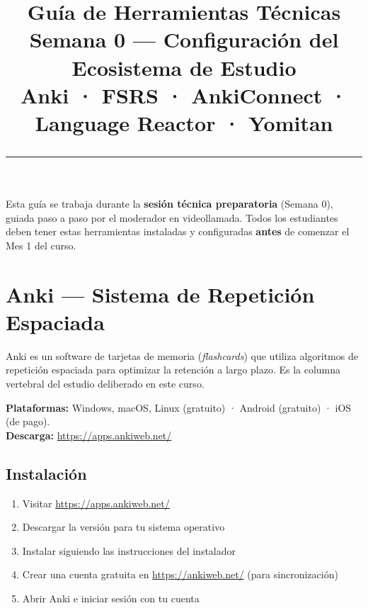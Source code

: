 \documentclass[12pt,a4paper]{article}
\title{%
  \vspace{-1cm}
  {\Huge\bfseries Guía de Herramientas Técnicas}\\[0.3cm]
  {\Large Semana 0 — Configuración del Ecosistema de Estudio}\\[0.2cm]
  {\large\color{grissuave} Anki · FSRS · AnkiConnect · Language Reactor · Yomitan}\\[0.5cm]
  \rule{\textwidth}{1.5pt}
}
\author{}
\date{}
\begin{document}
\maketitle
\thispagestyle{empty}

\vspace{-0.5cm}

\begin{cajaalerta}[\textcolor{white}{Importante: Completar ANTES de la Sesión 1}]
Esta guía se trabaja durante la \textbf{sesión técnica preparatoria} (Semana 0), guiada paso a paso por el moderador en videollamada. Todos los estudiantes deben tener estas herramientas instaladas y configuradas \textbf{antes} de comenzar el Mes 1 del curso.
\end{cajaalerta}

\section{Anki — Sistema de Repetición Espaciada}

\begin{cajaherramienta}
Anki es un software de tarjetas de memoria (\textit{flashcards}) que utiliza algoritmos de repetición espaciada para optimizar la retención a largo plazo. Es la columna vertebral del estudio deliberado en este curso.

\medskip
\textbf{Plataformas:} Windows, macOS, Linux (gratuito) · Android (gratuito) · iOS (de pago).\\
\textbf{Descarga:} \url{https://apps.ankiweb.net/}
\end{cajaherramienta}

\subsection{Instalación}

\begin{cajapaso}
\begin{enumerate}[leftmargin=1.2cm]
  \item Visitar \url{https://apps.ankiweb.net/}
  \item Descargar la versión para tu sistema operativo
  \item Instalar siguiendo las instrucciones del instalador
  \item Crear una cuenta gratuita en \url{https://ankiweb.net/} (para sincronización)
  \item Abrir Anki e iniciar sesión con tu cuenta
\end{enumerate}
\end{cajapaso}
\end{document}

